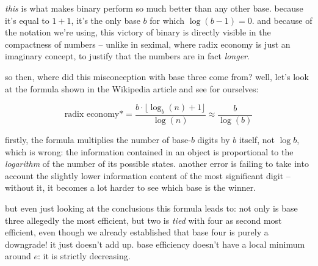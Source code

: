 \documentclass[../best.tex]{subfiles}
\begin{document}
\emph{this} is what makes binary perform so much better than any other base. because it's equal to $1 + 1$, it's the only base $b$ for which $\log(b - 1) = 0$.\myfootnote{} and because of the notation we're using, this victory of binary is directly visible in the compactness of numbers -- unlike in seximal, where radix economy is just an imaginary concept, to justify that the numbers are in fact \emph{longer}.

so then, where did this misconception with base three come from? well, let's look at the formula shown in the Wikipedia article and see for ourselves:

\begin{equation*}
	\text{radix economy*} = \frac{b \cdot \lfloor \log_b(n) + 1 \rfloor}{\log(n)} \approx \frac{b}{\log(b)}
\end{equation*}

firstly, the formula multiplies the number of base-$b$ digits by $b$ itself, not $\log b$, which is wrong: the information contained in an object is proportional to the \emph{logarithm} of the number of its possible states.\myfootnote{} another error is failing to take into account the slightly lower information content of the most significant digit -- without it, it becomes a lot harder to see which base is the winner.

but even just looking at the conclusions this formula leads to: not only is base three allegedly the most efficient, but two is \emph{tied} with four as second most efficient, even though we already established that base four is purely a downgrade! it just doesn't add up. base efficiency doesn't have a local minimum around $e$: it is strictly decreasing.
\end{document}
